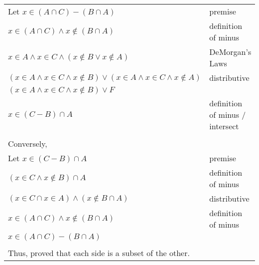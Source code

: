 \documentclass[12pt]{exam}
\begin{document}
\begin{solution}
  \begin{tabular}{ll}
    Let $x\in (A \cap C) - (B \cap A)$ &premise\\
    $x\in (A \cap C) \land x\notin (B \cap A)$ &definition of minus\\
    $x\in A \land x\in C \land (x\notin B \lor x\notin A)$ &DeMorgan's Laws\\
    $(x\in A \land x\in C \land x\notin B) \lor (x\in A \land x\in C \land x\notin A)$ &distributive\\
    $(x\in A \land x\in C \land x\notin B) \lor F$ &\\
    $x\in (C-B)\cap A$ &definition of minus / intersect\\

    \\Conversely,\\
    Let $x\in (C-B)\cap A$&premise\\
    $(x\in C \land x\notin B)\cap A$&definition of minus\\
    $(x\in C \cap x \in A) \land (x\notin B \cap A) $&distributive\\
    $x\in (A \cap C) \land x\notin (B \cap A)$ &definition of minus\\
    $x\in (A \cap C) - (B \cap A)$\\


    \\Thus, proved that each side is a subset of the other.


  \end{tabular}
\end{solution}
\end{document}
